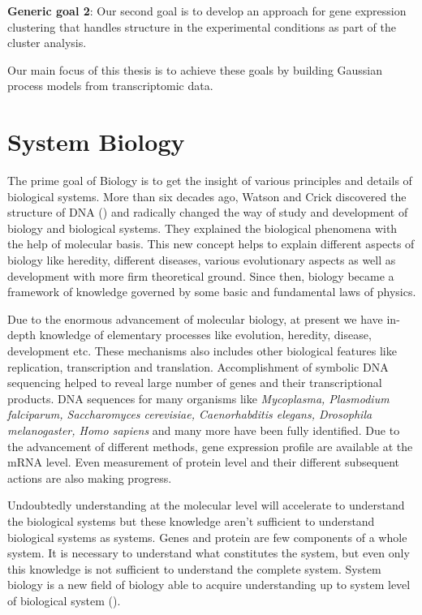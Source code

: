 \textbf{Generic goal 2}: Our second goal is to develop an approach for gene expression clustering that handles structure in the experimental conditions as part of the cluster analysis.

Our main focus of this thesis is to achieve these goals by building Gaussian process models from transcriptomic data.

\section{System Biology}
The prime goal of Biology is to get the insight of various principles and details of biological systems. More than six decades ago, Watson and Crick discovered the structure of DNA (\cite{Watson:1953}) and radically changed the way of study and development of biology and biological systems. They explained the biological phenomena with the help of molecular basis. This new concept helps to explain different aspects of biology like heredity, different diseases, various evolutionary aspects as well as development with more firm theoretical ground. Since then, biology became a framework of knowledge governed by some basic and fundamental laws of physics.

Due to the enormous advancement of molecular biology, at present we have in-depth knowledge of elementary processes like evolution, heredity, disease, development etc. These mechanisms also includes other biological features like replication, transcription and translation. Accomplishment of symbolic DNA sequencing helped to reveal large number of genes and their transcriptional products. DNA sequences for many organisms like \textit{Mycoplasma, Plasmodium falciparum, Saccharomyces cerevisiae, \textit{Caenorhabditis elegans}, Drosophila melanogaster, Homo sapiens} and many more have been fully identified. Due to the advancement of different methods, gene expression profile are available at the mRNA level. Even measurement of protein level and their different subsequent actions are also making progress. 

Undoubtedly understanding at the molecular level will accelerate to understand the biological systems but these knowledge aren't sufficient to understand biological systems as systems. Genes and protein are few components of a whole system. It is necessary to understand what constitutes the system, but even only this knowledge is not sufficient to understand the complete system. System biology is a new field of biology able to acquire understanding up to system level of biological system (\cite{Kitano:2000}). 

